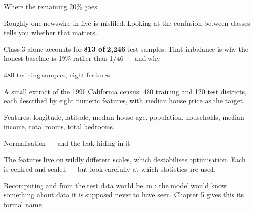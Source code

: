 \documentclass[aspectratio=169,11pt,t]{beamer}
\begin{document}
\begin{frame}[shrink=25]{Where the remaining 20\% goes}
{\fontsize{9.4}{12.6}\selectfont\color{fg2}Roughly one newswire in five is misfiled. Looking at the confusion between classes tells you whether that matters.\par}\vskip 4pt
\begin{iband}[amber]
Class 3 alone accounts for \textbf{813 of 2,246} test samples. That imbalance is why the honest baseline is 19\% rather than 1/46 --- and why 
\end{iband}
\end{frame}


\begin{frame}[shrink=25]{480 training samples, eight features}
{\fontsize{9.4}{12.6}\selectfont\color{fg2}A small extract of the 1990 California census: 480 training and 120 test districts, each described by eight numeric features, with median house price as the target.\par}\vskip 4pt
{\fontsize{9.4}{12.6}\selectfont\color{fg2}Features: longitude, latitude, median house age, population, households, median income, total rooms, total bedrooms.\par}\vskip 4pt
\end{frame}

\begin{frame}[shrink=25]{Normalisation --- and the leak hiding in it}
{\fontsize{9.4}{12.6}\selectfont\color{fg2}The features live on wildly different scales, which destabilises optimisation. Each is centred and scaled --- but look carefully at which statistics are used.\par}\vskip 4pt
\begin{iband}[rose]
Recomputing  and  from the test data would be an : the model would know something about data it is supposed never to have seen. Chapter 5 gives this its formal name.
\end{iband}
\end{frame}
\end{document}
